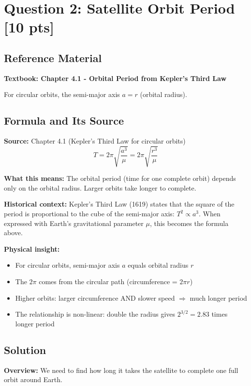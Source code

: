 \documentclass[11pt,letterpaper]{article}
\begin{document}
\section{Question 2: Satellite Orbit Period [10 pts]}

\subsection{Reference Material}
\textbf{Textbook: Chapter 4.1 - Orbital Period from Kepler's Third Law}

For circular orbits, the semi-major axis $a = r$ (orbital radius).

\subsection{Formula and Its Source}

\textbf{Source:} Chapter 4.1 (Kepler's Third Law for circular orbits)
\begin{equation}
T = 2\pi \sqrt{\frac{a^3}{\mu}} = 2\pi \sqrt{\frac{r^3}{\mu}}
\end{equation}

\textbf{What this means:} The orbital period (time for one complete orbit) depends only on the orbital radius. Larger orbits take longer to complete.

\textbf{Historical context:} Kepler's Third Law (1619) states that the square of the period is proportional to the cube of the semi-major axis: $T^2 \propto a^3$. When expressed with Earth's gravitational parameter $\mu$, this becomes the formula above.

\textbf{Physical insight:}
\begin{itemize}
    \item For circular orbits, semi-major axis $a$ equals orbital radius $r$
    \item The $2\pi$ comes from the circular path (circumference = $2\pi r$)
    \item Higher orbits: larger circumference AND slower speed $\Rightarrow$ much longer period
    \item The relationship is non-linear: double the radius gives $2^{3/2} = 2.83$ times longer period
\end{itemize}

\subsection{Solution}

\textbf{Overview:} We need to find how long it takes the satellite to complete one full orbit around Earth.
\end{document}
